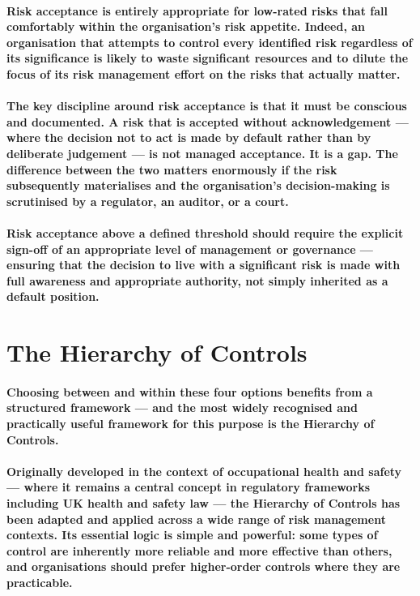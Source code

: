 \paragraph{Risk acceptance is entirely appropriate for low-rated risks that fall comfortably within the organisation's risk appetite. Indeed, an organisation that attempts to control every identified risk regardless of its significance is likely to waste significant resources and to dilute the focus of its risk management effort on the risks that actually matter.}
\paragraph{The key discipline around risk acceptance is that it must be \textbf{conscious and documented}. A risk that is accepted without acknowledgement — where the decision not to act is made by default rather than by deliberate judgement — is not managed acceptance. It is a gap. The difference between the two matters enormously if the risk subsequently materialises and the organisation's decision-making is scrutinised by a regulator, an auditor, or a court.}
\paragraph{Risk acceptance above a defined threshold should require the explicit sign-off of an appropriate level of management or governance — ensuring that the decision to live with a significant risk is made with full awareness and appropriate authority, not simply inherited as a default position.}

\section{The Hierarchy of Controls}
\paragraph{Choosing between and within these four options benefits from a structured framework — and the most widely recognised and practically useful framework for this purpose is the \textbf{Hierarchy of Controls}.}
\paragraph{Originally developed in the context of occupational health and safety — where it remains a central concept in regulatory frameworks including UK health and safety law — the Hierarchy of Controls has been adapted and applied across a wide range of risk management contexts. Its essential logic is simple and powerful: some types of control are inherently more reliable and more effective than others, and organisations should prefer higher-order controls where they are practicable.}
